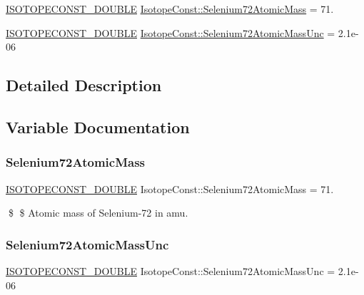\begin{DoxyCompactItemize}
\item 
\mbox{\hyperlink{group___isotope_const-_macros_ga8f45a7272ce02c0b4c65c44636ed719a}{I\+S\+O\+T\+O\+P\+E\+C\+O\+N\+S\+T\+\_\+\+D\+O\+U\+B\+LE}} \mbox{\hyperlink{group___isotope_const-_selenium-_se72_ga26f210877e169a262b6e272b0ab26c2a}{Isotope\+Const\+::\+Selenium72\+Atomic\+Mass}} = 71.
\item 
\mbox{\hyperlink{group___isotope_const-_macros_ga8f45a7272ce02c0b4c65c44636ed719a}{I\+S\+O\+T\+O\+P\+E\+C\+O\+N\+S\+T\+\_\+\+D\+O\+U\+B\+LE}} \mbox{\hyperlink{group___isotope_const-_selenium-_se72_ga9cba8c529cd24f8ba98387da707e8ef8}{Isotope\+Const\+::\+Selenium72\+Atomic\+Mass\+Unc}} = 2.\+1e-\/06
\end{DoxyCompactItemize}


\subsection{Detailed Description}


\subsection{Variable Documentation}
\mbox{\label{group___isotope_const-_selenium-_se72_ga26f210877e169a262b6e272b0ab26c2a}} 
\subsubsection{\texorpdfstring{Selenium72\+Atomic\+Mass}{Selenium72AtomicMass}}
{\footnotesize\ttfamily \mbox{\hyperlink{group___isotope_const-_macros_ga8f45a7272ce02c0b4c65c44636ed719a}{I\+S\+O\+T\+O\+P\+E\+C\+O\+N\+S\+T\+\_\+\+D\+O\+U\+B\+LE}} Isotope\+Const\+::\+Selenium72\+Atomic\+Mass = 71.}

\$ \$ Atomic mass of Selenium-\/72 in amu. \mbox{\label{group___isotope_const-_selenium-_se72_ga9cba8c529cd24f8ba98387da707e8ef8}} 
\subsubsection{\texorpdfstring{Selenium72\+Atomic\+Mass\+Unc}{Selenium72AtomicMassUnc}}
{\footnotesize\ttfamily \mbox{\hyperlink{group___isotope_const-_macros_ga8f45a7272ce02c0b4c65c44636ed719a}{I\+S\+O\+T\+O\+P\+E\+C\+O\+N\+S\+T\+\_\+\+D\+O\+U\+B\+LE}} Isotope\+Const\+::\+Selenium72\+Atomic\+Mass\+Unc = 2.\+1e-\/06}

